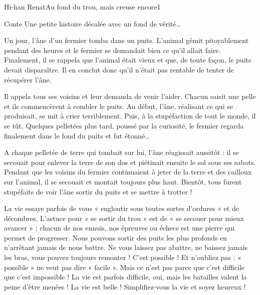 \documentclass{parch}
\begin{document}
	\begin{parchArticle}{Hi-han}
		{Renat}{Au fond du trou, mais creuse encore}{1}
		\begin{parchResumeTheme}{Conte}
			Une petite histoire décalée avec un fond de vérité…
		\end{parchResumeTheme}
		Un jour, l’âne d’un fermier tomba dans un puits. L’animal gémit pitoyablement pendant des heures et le fermier se demandait bien ce qu’il allait faire. Finalement, il se rappela que l’animal était vieux et que, de toute façon, le puits devait disparaître. Il en conclut donc qu'il n’était pas rentable de tenter de récupérer l’âne.
		
		Il appela tous ses voisins et leur demanda de venir l’aider. Chacun saisit une pelle et ils commencèrent à combler le puits. Au début, l’âne, réalisant ce qui se produisait, se mit à crier terriblement. Puis, à la stupéfaction de tout le monde, il se tût. Quelques pelletées plus tard, poussé par la curiosité, le fermier regarda finalement dans le fond du puits et fut étonné…
		
		
		A chaque pelletée de terre qui tombait sur lui, l’âne réagissait aussitôt : il se secouait pour enlever la terre de son dos et piétinait ensuite le sol sous ses sabots. Pendant que les voisins du fermier continuaient à jeter de la terre et des cailloux sur l’animal, il se secouait et montait toujours plus haut. Bientôt, tous furent stupéfaits de voir l’âne sortir du puits et se mettre à trotter !
		
		La vie essaye parfois de vous « engloutir sous toutes sortes d’ordures » et de décombres. L’astuce pour « se sortir du trou » est de « se secouer pour mieux avancer » ; chacun de nos ennuis, nos épreuves ou échecs est une pierre qui permet de progresser. Nous pouvons sortir des puits les plus profonds en n’arrêtant jamais de nous battre. Ne vous laissez pas abattre, ne baissez jamais les bras, vous pouvez toujours remonter ! C’est possible ! Et n’oubliez pas : « possible » ne veut pas dire « facile ». Mais ce n’est pas parce que c’est difficile que c’est impossible ! La vie est parfois difficile, oui, mais les batailles  valent la peine d'être menées ! La vie est belle ! Simplifiez-vous la vie et soyez heureux !
	\end{parchArticle}
	
\end{document}
